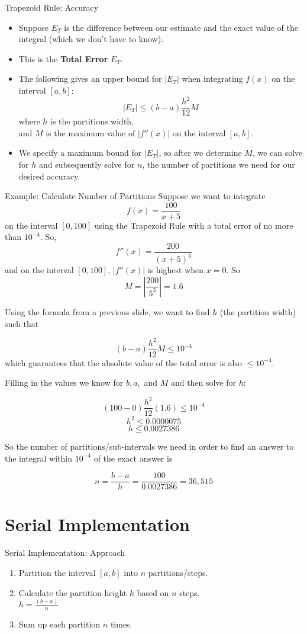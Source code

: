 \documentclass[t]{beamer}
\begin{document}
\begin{frame}{Trapezoid Rule: Accuracy}
	\begin{itemize}
		\item Suppose $E_T$ is the difference between our estimate and the exact value of the integral (which we don't have to know).
		\item This is the \textbf{Total Error} $E_T$.
		\item The following gives an upper bound for $|E_T|$ when integrating $f(x)$ on the interval $[a,b]$:
		\[|E_T|\leq(b-a)\frac{h^2}{12}M\]
		where $h$ is the partitions width,\\
		and $M$ is the maximum value of $|f''(x)|$ on the interval $[a,b]$.
		\item We specify a maximum bound for $|E_T|$, so after we determine $M$, we can solve for $h$ and subsequently solve for $n$, the number of partitions we need for our desired accuracy.
	\end{itemize}
\end{frame}

\begin{frame}[allowframebreaks]{Example: Calculate Number of Partitions}
Suppose we want to integrate
\[f(x)=\frac{100}{x+5}\]
on the interval $[0,100]$ using the Trapezoid Rule with a total error of no more than $10^{-4}$. So,
\[f''(x)=\frac{200}{(x+5)^3}\]
and on the interval $[0,100]$, $|f''(x)|$ is highest when $x=0$. So
\[M=\left|\frac{200}{5^3}\right|=1.6\]

\framebreak

Using the formula from a previous slide, we want to find $h$ (the partition width) such that

\[(b-a)\frac{h^2}{12}M\leq10^{-4}\]
which guarantees that the absolute value of the total error is also $\leq10^{-4}$.

Filling in the values we know for $b, a,$ and $M$ and then solve for $h$:

\[(100-0)\frac{h^2}{12}(1.6)\leq10^{-4}\]
\[h^2 \leq 0.0000075\]
\[h \leq 0.0027386\]

\framebreak

So the number of partitions/sub-intervals we need in order to find an answer to the integral within $10^{-4}$ of the exact answer is

\[n=\frac{b-a}{h}=\frac{100}{0.0027386}=36,515\]
\end{frame}

\section{Serial Implementation}
\begin{frame}{Serial Implementation: Approach}
	\begin{enumerate}
		\item Partition the interval $[a,b]$ into $n$ partitions/steps.
		\item Calculate the partition height $h$ based on $n$ steps. \\
			$h = \frac{(b-a)}{n}$
		\item Sum up each partition $n$ times.
	\end{enumerate}
\end{frame}
\end{document}
